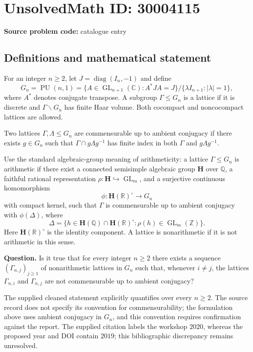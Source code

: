 \documentclass[11pt]{article}
\newcommand{\Z}{\mathbb{Z}}
\newcommand{\Q}{\mathbb{Q}}
\newcommand{\R}{\mathbb{R}}
\newcommand{\C}{\mathbb{C}}
\begin{document}
\section*{UnsolvedMath ID: 30004115}
\textbf{Source problem code:} catalogue entry
\subsection{Definitions and mathematical statement}
For an integer \(n\geq 2\), let \(J=\operatorname{diag}(I_n,-1)\) and define
\[
G_n=\operatorname{PU}(n,1)=\{A\in\operatorname{GL}_{n+1}(\C):A^*JA=J\}/\{\lambda I_{n+1}:|\lambda|=1\},
\]
where \(A^*\) denotes conjugate transpose. A subgroup \(\Gamma\leq G_n\) is a lattice if it is discrete and \(\Gamma\backslash G_n\) has finite Haar volume. Both cocompact and noncocompact lattices are allowed.

Two lattices \(\Gamma,\Lambda\leq G_n\) are commensurable up to ambient conjugacy if there exists \(g\in G_n\) such that \(\Gamma\cap g\Lambda g^{-1}\) has finite index in both \(\Gamma\) and \(g\Lambda g^{-1}\).

Use the standard algebraic-group meaning of arithmeticity: a lattice \(\Gamma\leq G_n\) is arithmetic if there exist a connected semisimple algebraic group \(\mathbf H\) over \(\Q\), a faithful rational representation \(\rho:\mathbf H\hookrightarrow\operatorname{GL}_m\), and a surjective continuous homomorphism
\[
\phi:\mathbf H(\R)^\circ\longrightarrow G_n
\]
with compact kernel, such that \(\Gamma\) is commensurable up to ambient conjugacy with \(\phi(\Delta)\), where
\[
\Delta=\{h\in\mathbf H(\Q)\cap\mathbf H(\R)^\circ:\rho(h)\in\operatorname{GL}_m(\Z)\}.
\]
Here \(\mathbf H(\R)^\circ\) is the identity component. A lattice is nonarithmetic if it is not arithmetic in this sense.

\textbf{Question.} Is it true that for every integer \(n\geq 2\) there exists a sequence \((\Gamma_{n,j})_{j\geq 1}\) of nonarithmetic lattices in \(G_n\) such that, whenever \(i\neq j\), the lattices \(\Gamma_{n,i}\) and \(\Gamma_{n,j}\) are not commensurable up to ambient conjugacy?

The supplied cleaned statement explicitly quantifies over every \(n\geq 2\). The source record does not specify its convention for commensurability; the formulation above uses ambient conjugacy in \(G_n\), and this convention requires confirmation against the report. The supplied citation labels the workshop \(2020\), whereas the proposed year and DOI contain \(2019\); this bibliographic discrepancy remains unresolved.
\end{document}
